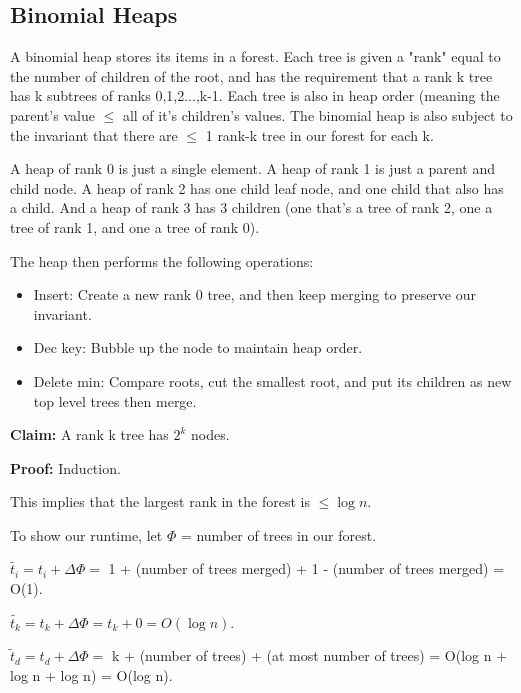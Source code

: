 \documentclass[11pt]{article}
\begin{document}
\subsection{Binomial Heaps}

A binomial heap stores its items in a forest.  Each tree is given a "rank" equal to the number of children of the root, and has the requirement that a rank k tree has k subtrees of ranks 0,1,2...,k-1.  Each tree is also in heap order (meaning the parent's value $\leq$ all of it's children's values.  The binomial heap is also subject to the invariant that there are $\leq$ 1 rank-k tree in our forest for each k.

A heap of rank 0 is just a single element.  A heap of rank 1 is just a parent and child node.  A heap of rank 2 has one child leaf node, and one child that also has a child.  And a heap of rank 3 has 3 children (one that's a tree of rank 2, one a tree of rank 1, and one a tree of rank 0).

The heap then performs the following operations:
\begin{itemize}

\item Insert: Create a new rank 0 tree, and then keep merging to preserve our invariant.

\item Dec key: Bubble up the node to maintain heap order.

\item Delete min: Compare roots, cut the smallest root, and put its children as new top level trees then merge.
\end{itemize}


\textbf{Claim:} A rank k tree has $2^k$ nodes.

\textbf{Proof:} Induction.

This implies that the largest rank in the forest is $\leq \log n$.

To show our runtime, let $\Phi$ = number of trees in our forest.

$\tilde{t_i} = t_i + \Delta\Phi =$ 1 + (number of trees merged) + 1 - (number of trees merged) = O(1).

$\tilde{t_k} = t_k + \Delta\Phi = t_k + 0 = O(\log n)$.

$\tilde t_d = t_d + \Delta\Phi =$ k + (number of trees) + (at most number of trees) = O(log n + log n + log n) = O(log n).




\end{document}
